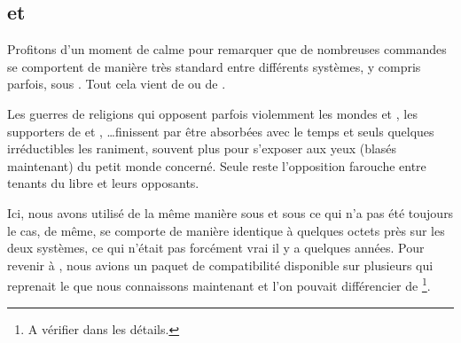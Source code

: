 \subsection{\POSIX{} et \GNU{}}
Profitons d'un moment de calme pour remarquer que de nombreuses commandes se comportent de manière très standard entre différents systèmes, y compris parfois, sous \msdos{}. Tout cela vient de \POSIX{} ou de \GNU{}.

Les guerres de religions qui opposent parfois violemment les mondes \BSD{} et \linux{}, les supporters de  et , \ldots finissent par être absorbées avec le temps et seuls quelques irréductibles les raniment, souvent plus pour s'exposer aux yeux (blasés maintenant) du petit monde concerné. Seule reste l'opposition farouche entre tenants du libre et leurs opposants.

Ici, nous avons utilisé  de la même manière sous \linux{} et sous \netbsd{} ce qui n'a pas été toujours le cas, de même, \sh{} se comporte de manière identique à quelques octets près sur les deux systèmes, ce qui n'était pas forcément vrai il y a quelques années. Pour revenir à , nous avions un paquet de compatibilité \GNU{} disponible sur plusieurs \BSD{} qui reprenait le  que nous connaissons maintenant et l'on pouvait différencier  de \footnote{A vérifier dans les détails.}.
